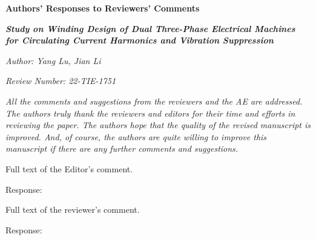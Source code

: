\documentclass[12pt]{article}
\begin{document}
\begin{center}
	{\Large\bf {Authors' Responses to Reviewers' Comments}}
	
	\vspace{2ex}
    {\bf \textit{Study on Winding Design of Dual Three-Phase Electrical Machines for Circulating Current Harmonics and Vibration Suppression}}
    
    \vspace{1ex}
    \emph{Author: Yang Lu, Jian Li}
    
    \emph{Review Number: 22-TIE-1751}
\end{center}

\emph{All the comments and suggestions from the reviewers and the AE are addressed. The authors truly thank the reviewers and editors for their time and efforts in reviewing the paper. The authors hope that the quality of the revised manuscript is improved. And, of course, the authors are quite willing to improve this manuscript if there are any further comments and suggestions.}

\begin{refcomment}
	Full text of the Editor's comment.
\end{refcomment}

Response:

\begin{refcomment}
  Full text of the reviewer's comment.
\end{refcomment}

Response:
\end{document}
